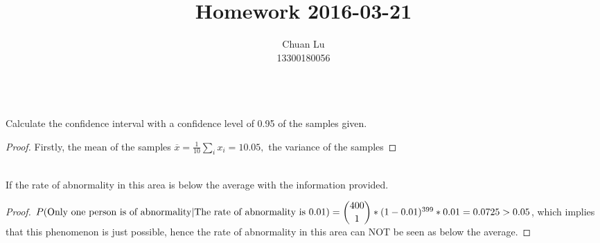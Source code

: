 \documentclass{article}
\newenvironment{problem}[2][Problem]{\begin{trivlist}
\item[\hskip \labelsep {\bfseries #1}\hskip \labelsep {\bfseries #2.}]}{\end{trivlist}}
\begin{document}
\title{Homework 2016-03-21}
\author{Chuan Lu\\
13300180056}

\maketitle

\begin{problem}{1}
\text{ }\\
Calculate the confidence interval with a confidence level of 0.95 of the samples given.
\end{problem}
\begin{proof}
Firstly, the mean of the samples $\overline{x} = \frac{1}{10}\sum_{i}{x_{i}} = 10.05,$ the variance of the samples 
\end{proof}


\begin{problem}{2}
\text{ }\\
If the rate of abnormality in this area is below the average with the information provided.
\end{problem}
\begin{proof}
$P(\mbox{Only one person is of abnormality}\vert\mbox{The rate of abnormality is 0.01}) =  \dbinom{400}{1}*(1-0.01)^{399}*0.01 = 0.0725 > 0.05$, which implies that this phenomenon is just possible, hence the rate of abnormality in this area can NOT be seen as below the average.
\end{proof}


\end{document}
